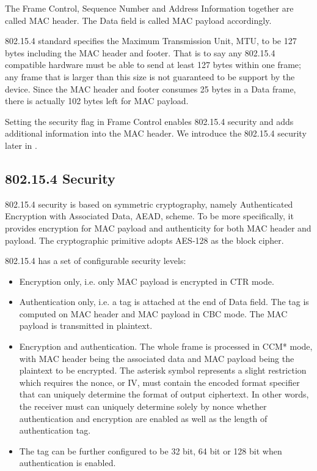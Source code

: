 The Frame Control, Sequence Number and Address Information together are called MAC header. The Data field is called MAC payload accordingly. 

802.15.4 standard specifies the Maximum Transmission Unit, MTU, to be 127 bytes including the MAC header and footer. That is to say any 802.15.4 compatible hardware must be able to send at least 127 bytes within one frame; any frame that is larger than this size is not guaranteed to be support by the device. Since the MAC header and footer consumes 25 bytes in a Data frame, there is actually 102 bytes left for MAC payload.

Setting the security flag in Frame Control enables 802.15.4 security and adds additional information into the MAC header. We introduce the 802.15.4 security later in .

\subsection{802.15.4 Security} \label{Subsec: 802154 Sec}
802.15.4 security is based on symmetric cryptography, namely Authenticated Encryption with Associated Data, AEAD, scheme. To be more specifically, it provides encryption for MAC payload and authenticity for both MAC header and payload. The cryptographic primitive adopts AES-128 as the block cipher.

802.15.4 has a set of configurable security levels:
\begin{itemize}
\item Encryption only, i.e. only MAC payload is encrypted in CTR mode.
\item Authentication only, i.e. a tag is attached at the end of Data field. The tag is computed on MAC header and MAC payload in CBC mode. The MAC payload is transmitted in plaintext.
\item Encryption and authentication. The whole frame is processed in CCM*\cite{802154} mode, with MAC header being the associated data and MAC payload being the plaintext to be encrypted. The asterisk symbol represents a slight restriction which requires the nonce, or IV, must contain the encoded format specifier that can uniquely determine the format of output ciphertext. In other words, the receiver must can uniquely determine solely by nonce whether authentication and encryption are enabled as well as the length of authentication tag.
\item The tag can be further configured to be 32 bit, 64 bit or 128 bit when authentication is enabled.
\end{itemize}

